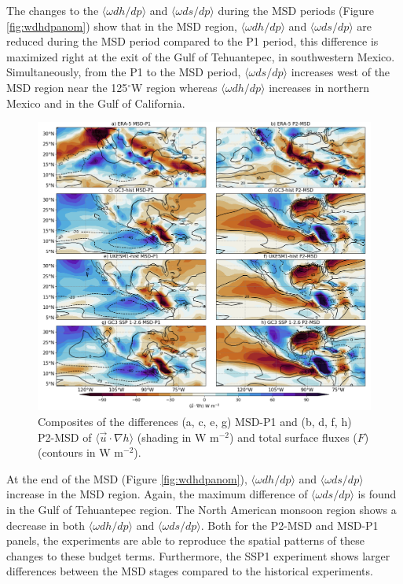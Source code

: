  The changes to the $\langle \omega dh/dp \rangle$ and $\langle \omega ds/dp \rangle$ during the MSD periods (Figure \ref{fig:wdhdpanom}) show that in the MSD region, $\langle \omega dh/dp \rangle$ and $\langle \omega ds/dp \rangle$ are reduced during the MSD period compared to the P1 period, this difference is maximized right at the exit of the Gulf of Tehuantepec, in southwestern Mexico. 
 Simultaneously, from the P1 to the MSD period, $\langle \omega ds/dp \rangle$ increases west of the MSD region near the 125$^\circ$W region whereas $\langle \omega dh/dp \rangle$ increases in northern Mexico and in the Gulf of California. 
 
\begin{figure}[t!]
\includegraphics[width=\linewidth]{figures/thermocompositeint_udothanom.png}
\caption[Composites of the anomalous horizontal advection of MSE and surface fluxes]{Composites of the differences (a, c, e, g) MSD-P1 and (b, d, f, h) P2-MSD of $\langle \vec{u}\cdot\nabla h \rangle$ (shading in W m$^{-2}$) and total surface fluxes ($F$) (contours in W m$^{-2}$).  }
\label{fig:intudothanom}
\end{figure} 
  
 
 At the end of the MSD (Figure \ref{fig:wdhdpanom}), $\langle \omega dh/dp \rangle$ and $\langle \omega ds/dp \rangle$ increase in the MSD region. Again, the maximum difference of $\langle \omega ds/dp \rangle$ is found in the Gulf of Tehuantepec region. The North American monsoon region shows a decrease in both $\langle \omega dh/dp \rangle$ and $\langle \omega ds/dp \rangle$. 
 Both for the P2-MSD and MSD-P1 panels, the experiments are able to reproduce the spatial patterns of these changes to these budget terms. Furthermore, the SSP1 experiment shows larger differences between the MSD stages compared to the historical experiments.


